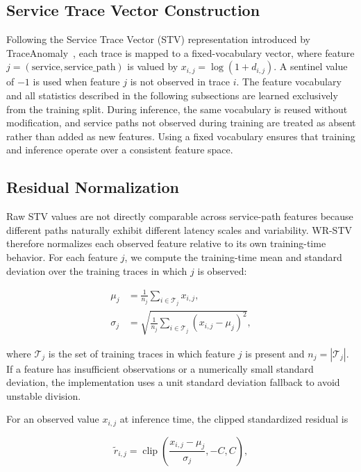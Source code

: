 \documentclass[informatics,article,submit,moreauthors]{Definitions/mdpi}
\begin{document}
\subsection{Service Trace Vector Construction}

Following the Service Trace Vector (STV) representation introduced by
TraceAnomaly~\cite{liu2020traceanomaly}, each trace is mapped to a
fixed-vocabulary vector, where feature
\(j=(\text{service},\text{service\_path})\) is valued by
\(x_{i,j}=\log(1+d_{i,j})\). A sentinel value of \(-1\) is used when
feature \(j\) is not observed in trace \(i\). The feature vocabulary and
all statistics described in the following subsections are learned
exclusively from the training split. During inference, the same
vocabulary is reused without modification, and service paths not observed
during training are treated as absent rather than added as new features.
Using a fixed vocabulary ensures that training and inference operate over
a consistent feature space.

\subsection{Residual Normalization}

Raw STV values are not directly comparable across service-path features
because different paths naturally exhibit different latency scales and
variability. WR-STV therefore normalizes each observed feature relative
to its own training-time behavior. For each feature \(j\), we compute
the training-time mean and standard deviation over the training traces in
which \(j\) is observed:

\begin{align}
	\mu_j
	&=
	\frac{1}{n_j}
	\sum_{i \in \mathcal{T}_j}
	x_{i,j},
	\label{eq:mean}
	\\
	\sigma_j
	&=
	\sqrt{
		\frac{1}{n_j}
		\sum_{i \in \mathcal{T}_j}
		(x_{i,j} - \mu_j)^2
	},
	\label{eq:std}
\end{align}

\noindent where \(\mathcal{T}_j\) is the set of training traces in which
feature \(j\) is present and \(n_j = |\mathcal{T}_j|\). If a feature has
insufficient observations or a numerically small standard deviation, the
implementation uses a unit standard deviation fallback to avoid unstable
division.

For an observed value \(x_{i,j}\) at inference time, the clipped
standardized residual is

\begin{equation}
	\tilde{r}_{i,j}
	=
	\operatorname{clip}
	\left(
	\frac{x_{i,j}-\mu_j}{\sigma_j},
	-C,
	C
	\right),
	\label{eq:residual}
\end{equation}
\end{document}
